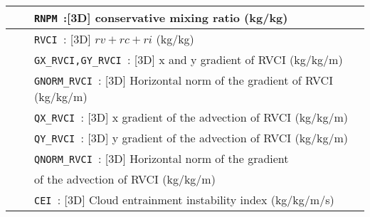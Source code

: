 \begin{center}
\begin{tabular}{|>{\centering}p{3cm}|>{\centering}p{2.5cm}|p{11cm}|}
& & {\tt RNPM }:[3D] conservative mixing ratio (kg/kg)\\\cline{3-3}
&& {\tt RVCI }: [3D] $rv+rc+ri$ (kg/kg)\\\cline{3-3}
& & {\tt GX\_RVCI,GY\_RVCI }: [3D] x and y gradient of RVCI (kg/kg/m) \\\cline{3-3}
& &{\tt GNORM\_RVCI }: [3D] Horizontal norm of the gradient of RVCI (kg/kg/m) \\\cline{3-3}
& &{\tt QX\_RVCI }: [3D] x  gradient of the advection of RVCI (kg/kg/m)  \\\cline{3-3}
& &{\tt QY\_RVCI }: [3D] y gradient of the advection of RVCI (kg/kg/m)  \\\cline{3-3}

& &{\tt QNORM\_RVCI }: [3D] Horizontal norm of the gradient\\
& &  of the advection of RVCI (kg/kg/m)  \\\cline{3-3}
& &{\tt CEI }: [3D] Cloud entrainment instability index (kg/kg/m/s) \\ \hline
\end{tabular} 
\end{center}
\newpage
